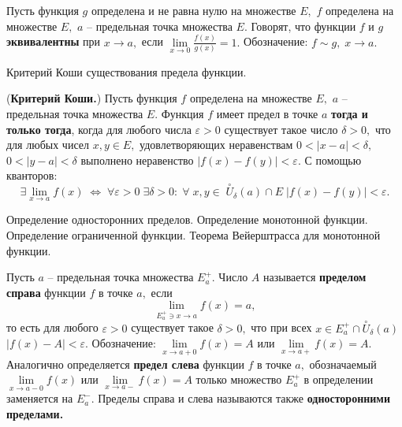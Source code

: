 \begin{definition}
	Пусть функция $g$ определена и не равна нулю
	на множестве $E,$
	$f$ определена на множестве
	$E,$ $a$ -- предельная точка множества
	$E.$ Говорят, что функции $f$ и $g$
	\textbf{эквивалентны} при $x\rightarrow a,$
	если $\lim\limits_{x\rightarrow0}
		\frac{f(x)}{g(x)}=1.$ Обозначение:
	$f\sim g,\;x\rightarrow a.$
\end{definition}
\newpage
\begin{problem}
Критерий Коши существования предела функции.
\end{problem}

\begin{theorem} (\textbf{Критерий Коши.})
	Пусть функция $f$ определена на множестве $E,$
	$a$ -- предельная точка множества $E.$
	Функция $f$ имеет предел в точке $a$
	\textbf{тогда и только тогда}, когда для любого
	числа $\varepsilon>0$ существует такое число
	$\delta>0,$ что для любых чисел $x, y \in E,$
	удовлетворяющих неравенствам $0<|x-a|<\delta,$
	$0<|y-a|<\delta$ выполнено неравенство $|f(x)-
		f(y)|<\varepsilon.$ С помощью кванторов:
	$$\exists \lim\limits_{x\rightarrow a}f(x)\;
		\Leftrightarrow\;\forall \varepsilon > 0\;
		\exists \delta >0 :\;\forall \;x, y \in\;
		\stackrel{\circ}{U}_{\delta}(a) \cap E\;
		|f(x) - f(y)| < \varepsilon.
	$$
\end{theorem}

\newpage
\begin{problem}
Определение односторонних пределов. Определение монотонной функции. Определение ограниченной функции. Теорема Вейерштрасса для монотонной функции.
\end{problem}

\begin{definition}
	Пусть $a$ -- предельная точка множества $E^+_a.$
	Число $A$ называется \textbf{пределом справа}
	функции $f$ в точке $a,$ если
	$$
		\lim\limits_{E^+_a\ni x\to a}f(x)=a,
	$$
	то есть для любого
	$\varepsilon>0$ существует такое $\delta>0,$
	что при всех $x \in
		E^+_a\cap\stackrel{\circ}{U}_{\delta}(a)$
	$|f(x)-A|<\varepsilon.$
	Обозначение: $\lim\limits_{x\rightarrow a+0}f(x)=A$
	или $\lim\limits_{x\rightarrow a+}f(x)=A.$
	Аналогично определяется \textbf{предел слева} функции
	$f$ в точке $a,$ обозначаемый
	$\lim\limits_{x\rightarrow a-0}f(x)$
	или $\lim\limits_{x\rightarrow a-}f(x)=A$
	только множество $E^+_a$ в
	определении заменяется на $E^-_a.$
	Пределы справа и слева называются также
	\textbf{односторонними пределами.}
\end{definition}

